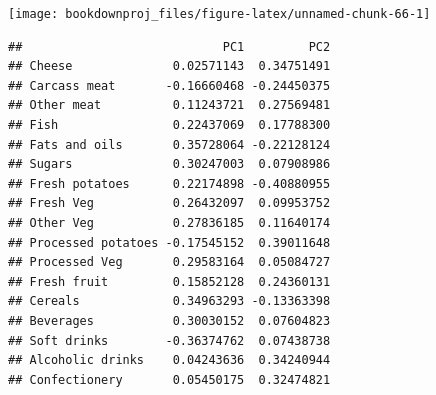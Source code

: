 \documentclass[
]{article}
\newenvironment{Shaded}{\begin{snugshade}}{\end{snugshade}}
\newcommand{\AttributeTok}[1]{\textcolor[rgb]{0.77,0.63,0.00}{#1}}
\newcommand{\CommentTok}[1]{\textcolor[rgb]{0.56,0.35,0.01}{\textit{#1}}}
\newcommand{\DecValTok}[1]{\textcolor[rgb]{0.00,0.00,0.81}{#1}}
\newcommand{\FloatTok}[1]{\textcolor[rgb]{0.00,0.00,0.81}{#1}}
\newcommand{\FunctionTok}[1]{\textcolor[rgb]{0.00,0.00,0.00}{#1}}
\newcommand{\NormalTok}[1]{#1}
\newcommand{\OtherTok}[1]{\textcolor[rgb]{0.56,0.35,0.01}{#1}}
\newcommand{\SpecialCharTok}[1]{\textcolor[rgb]{0.00,0.00,0.00}{#1}}
\newcommand{\StringTok}[1]{\textcolor[rgb]{0.31,0.60,0.02}{#1}}
\theoremstyle{definition}
\theoremstyle{definition}
\theoremstyle{definition}
\theoremstyle{definition}
\theoremstyle{remark}
\begin{document}
\begin{Shaded}
\end{Shaded}

\begin{center}\texttt{[image: bookdownproj\_files/figure-latex/unnamed-chunk-66-1]} \end{center}

\begin{Shaded}
\end{Shaded}

\begin{verbatim}
##                            PC1         PC2
## Cheese              0.02571143  0.34751491
## Carcass meat       -0.16660468 -0.24450375
## Other meat          0.11243721  0.27569481
## Fish                0.22437069  0.17788300
## Fats and oils       0.35728064 -0.22128124
## Sugars              0.30247003  0.07908986
## Fresh potatoes      0.22174898 -0.40880955
## Fresh Veg           0.26432097  0.09953752
## Other Veg           0.27836185  0.11640174
## Processed potatoes -0.17545152  0.39011648
## Processed Veg       0.29583164  0.05084727
## Fresh fruit         0.15852128  0.24360131
## Cereals             0.34963293 -0.13363398
## Beverages           0.30030152  0.07604823
## Soft drinks        -0.36374762  0.07438738
## Alcoholic drinks    0.04243636  0.34240944
## Confectionery       0.05450175  0.32474821
\end{verbatim}
\end{document}

